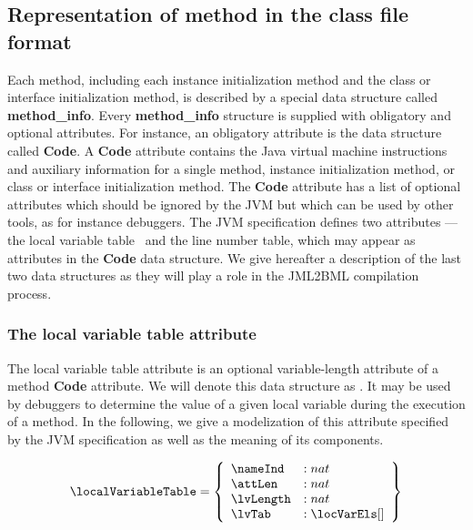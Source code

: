  



\subsection{Representation of method in the class file format}

Each method, including each instance initialization method and the class or interface initialization method, is described by a special data structure
called \textbf{method\_info}. Every \textbf{method\_info} structure is supplied with obligatory and optional attributes.
For instance,  an obligatory attribute is  the data structure called  \textbf{Code}.
A \textbf{Code} attribute contains the Java virtual machine instructions and auxiliary information for a single method, instance initialization method,
 or class or interface initialization method.
The \textbf{Code} attribute has a list of optional  attributes which should be ignored by the JVM but which can be used by other tools, as for instance debuggers.
The JVM specification defines two attributes --- the local variable table \ and the line number table,  which may appear
 as attributes in the  \textbf{Code} data structure.
We give hereafter a description of the last two data structures as they will play a role in the JML2BML compilation process. 

\subsubsection{The local variable table attribute } \label{locVarTab}
The local variable table attribute is an optional variable-length attribute of a method \textbf{Code}  attribute. 
We will denote this data structure as  \localVariableTable.
It may be used by debuggers to determine the value of a given local variable during the execution of a method.
In the following, we give a modelization of this attribute specified by the JVM specification as well as the meaning of its components.



$$\localVariableTable = \left\{\begin{array}{ll} \nameInd  & :   nat \\
                                                    \attLen & : nat \\
                                                \lvLength   & :  nat\\
						\lvTab  & : \locVarEls []
	                        \end{array} \right\} $$


